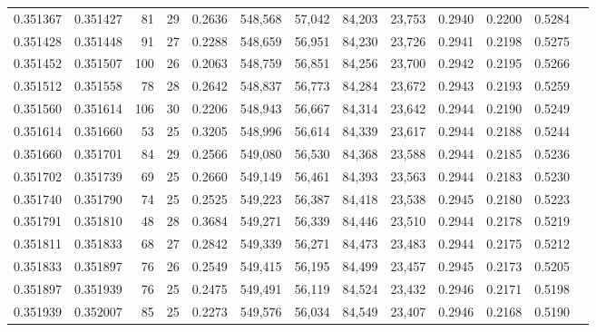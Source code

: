 \begin{tabular}{rrrrrrrrrrrrr}
0.351367 & 0.351427 &    81 &  29 &                                     0.2636 & 548,568 &  57,042 &  84,203 &  23,753 & 0.2940 & 0.2200 & 0.5284 \\
0.351428 & 0.351448 &    91 &  27 &                                     0.2288 & 548,659 &  56,951 &  84,230 &  23,726 & 0.2941 & 0.2198 & 0.5275 \\
0.351452 & 0.351507 &   100 &  26 &                                     0.2063 & 548,759 &  56,851 &  84,256 &  23,700 & 0.2942 & 0.2195 & 0.5266 \\
0.351512 & 0.351558 &    78 &  28 &                                     0.2642 & 548,837 &  56,773 &  84,284 &  23,672 & 0.2943 & 0.2193 & 0.5259 \\
0.351560 & 0.351614 &   106 &  30 &                                     0.2206 & 548,943 &  56,667 &  84,314 &  23,642 & 0.2944 & 0.2190 & 0.5249 \\
0.351614 & 0.351660 &    53 &  25 &                                     0.3205 & 548,996 &  56,614 &  84,339 &  23,617 & 0.2944 & 0.2188 & 0.5244 \\
0.351660 & 0.351701 &    84 &  29 &                                     0.2566 & 549,080 &  56,530 &  84,368 &  23,588 & 0.2944 & 0.2185 & 0.5236 \\
0.351702 & 0.351739 &    69 &  25 &                                     0.2660 & 549,149 &  56,461 &  84,393 &  23,563 & 0.2944 & 0.2183 & 0.5230 \\
0.351740 & 0.351790 &    74 &  25 &                                     0.2525 & 549,223 &  56,387 &  84,418 &  23,538 & 0.2945 & 0.2180 & 0.5223 \\
0.351791 & 0.351810 &    48 &  28 &                                     0.3684 & 549,271 &  56,339 &  84,446 &  23,510 & 0.2944 & 0.2178 & 0.5219 \\
0.351811 & 0.351833 &    68 &  27 &                                     0.2842 & 549,339 &  56,271 &  84,473 &  23,483 & 0.2944 & 0.2175 & 0.5212 \\
0.351833 & 0.351897 &    76 &  26 &                                     0.2549 & 549,415 &  56,195 &  84,499 &  23,457 & 0.2945 & 0.2173 & 0.5205 \\
0.351897 & 0.351939 &    76 &  25 &                                     0.2475 & 549,491 &  56,119 &  84,524 &  23,432 & 0.2946 & 0.2171 & 0.5198 \\
0.351939 & 0.352007 &    85 &  25 &                                     0.2273 & 549,576 &  56,034 &  84,549 &  23,407 & 0.2946 & 0.2168 & 0.5190 \\

\end{tabular}
